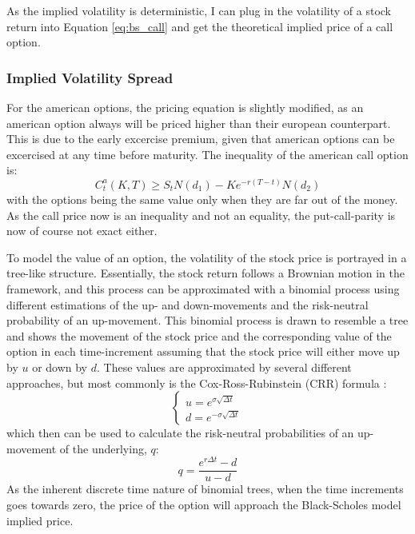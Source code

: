 As the implied volatility is deterministic, I can plug in the volatility of a stock return into Equation \ref{eq:bs_call} and get the theoretical implied price of a call option.

\subsubsection{Implied Volatility Spread}

For the american options, the pricing equation is slightly modified, as an american option always will be priced higher than their european counterpart. This is due to the early excercise premium, given that american options can be excercised at any time before maturity. The inequality of the american call option is:
\begin{equation}
	C_{t}^{a}(K,T) \geq S_{t}N\left(d_{1}\right)-Ke^{-r\left(T-t\right)}N\left(d_{2}\right)
\end{equation}
with the options being the same value only when they are far out of the money. As the call price now is an inequality and not an equality, the put-call-parity is now of course not exact either.

To model the value of an option, the volatility of the stock price is portrayed in a tree-like structure. 
Essentially, the stock return follows a Brownian motion in the \cite{black1973pricing} framework, and this process can be approximated with a binomial process using different estimations of the up- and down-movements and the risk-neutral probability of an up-movement. This binomial process is drawn to resemble a tree and shows the movement of the stock price and the corresponding value of the option in each time-increment assuming that the stock price will either move up by $u$ or down by $d$. These values are approximated by several different approaches, but most commonly is the Cox-Ross-Rubinstein (CRR) formula \citep{cox1979option}:
\begin{equation}
	\begin{cases}
		u=e^{\sigma\sqrt{\Delta t}}\\
		d=e^{-\sigma\sqrt{\Delta t}}
	\end{cases}
\end{equation}
which then can be used to calculate the risk-neutral probabilities of an up-movement of the underlying, $q$:
\begin{equation}
	q=\frac{e^{r\Delta t}-d}{u-d}
\end{equation}
As the inherent discrete time nature of binomial trees, when the time increments goes towards zero, the price of the option will approach the Black-Scholes model implied price.

